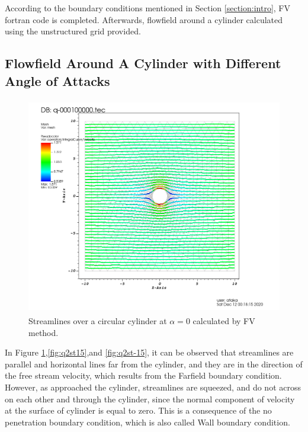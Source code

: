 \documentclass[letterpaper,12pt]{article}
\begin{document}
According to the boundary conditions mentioned in Section \ref{section:intro}, FV fortran code
is completed. Afterwards, flowfield around a cylinder calculated using the unstructured grid provided.

\newpage

\subsection{Flowfield Around A Cylinder with Different Angle of Attacks}
\begin{figure} [ht]
	\centering
	\includegraphics[height = 9.5cm]{graph/0deg/Cylinder_0angle_streamline0000.png}
	\caption{Streamlines over a circular cylinder at $\alpha=0$ calculated by FV method.}
    \label{fig:q2st0}
\end{figure}

In Figure \ref{fig:q2st0},\ref{fig:q2st15},and \ref{fig:q2st-15}, it can be observed that streamlines 
are parallel and horizontal lines far from the cylinder, and they are in the direction of the free stream velocity,
which results from the Farfield boundary condition. However, as approached the cylinder, streamlines are squeezed,
and do not across on each other and through the cylinder, since the normal component of velocity at 
the surface of cylinder is equal to zero. This is a consequence of the no penetration boundary condition, which
is also called Wall boundary condition.

\newpage
\end{document}
